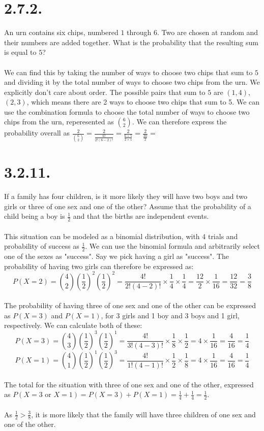 \documentclass{article}
\begin{document}
{\section*{2.7.2.} 
An urn contains six chips, numbered \(1\) through \(6\). Two are chosen at random and their numbers are added together. What is the probability that the resulting sum is equal to \(5\)?
\\
\\
We can find this by taking the number of ways to choose two chips that sum to \(5\) and dividing it by the total number of ways to choose two chips from the urn. We explicitly don't care about order. The possible pairs that sum to \(5\) are \((1, 4)\), \((2, 3)\), which means there are 2 ways to choose two chips that sum to 5. We can use the combination formula to choose the total number of ways to choose two chips from the urn, reperesented as \(\binom{6}{2}\). We can therefore express the probability overall as \(\frac{2}{\binom{6}{2}} = \frac{2}{\frac{6!}{2!(6-2)!}} = \frac{2}{\frac{6 \times 5}{2 \times 1}} = \frac{2}{\frac{30}{2}} = \) 

\section*{3.2.11.} 
If a family has four children, is it more likely they will have two boys and two girls or three of one sex and one of the other? Assume that the probability of a child being a boy is \(\frac{1}{2}\) and that the births are independent events.
\\
\\
This situation can be modeled as a binomial distribution, with 4 trials and probability of success as \(\frac{1}{2}\). We can use the binomial formula and arbitrarily select one of the sexes as "success". Say we pick having a girl as "success". The probability of having two girls can therefore be expressed as: 
\[
P(X = 2) = \binom{4}{2} \left(\frac{1}{2}\right)^2 \left(\frac{1}{2}\right)^2 = \frac{4!}{2!(4-2)!} \times \frac{1}{4} \times \frac{1}{4} = \frac{12}{2} \times \frac{1}{16} = \frac{12}{32} = \frac{3}{8}
\]
\\
The probability of having three of one sex and one of the other can be expressed as \(P(X = 3)\) and \(P(X = 1)\), for 3 girls and 1 boy and 3 boys and 1 girl, respectively. We can calculate both of these:
\[
P(X = 3) = \binom{4}{3} \left(\frac{1}{2}\right)^3 \left(\frac{1}{2}\right)^1 = \frac{4!}{3!(4-3)!} \times \frac{1}{8} \times \frac{1}{2} = 4 \times \frac{1}{16} = \frac{4}{16} = \frac{1}{4}
\]
\[
P(X = 1) = \binom{4}{1} \left(\frac{1}{2}\right)^1 \left(\frac{1}{2}\right)^3 = \frac{4!}{1!(4-1)!} \times \frac{1}{2} \times \frac{1}{8} = 4 \times \frac{1}{16} = \frac{4}{16} = \frac{1}{4}
\]
\\
The total for the situation with three of one sex and one of the other, expressed as \(P(X = 3 \text{ or } X = 1) = P(X = 3) + P(X = 1) = \frac{1}{4} + \frac{1}{4} = \frac{1}{2}\).
\\
\\ 
As \( \frac{1}{2} > \frac{3}{8}\), it is more likely that the family will have three children of one sex and one of the other.

}
\end{document}
